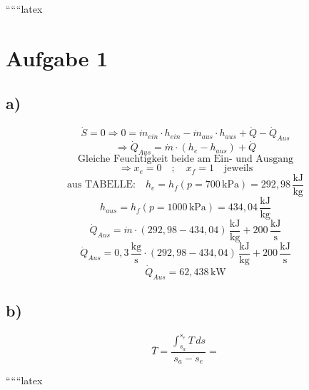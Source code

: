 
``````latex


\section*{Aufgabe 1}

\subsection*{a)}
\[
\dot{S} = 0 \Rightarrow 0 = \dot{m}_{ein} \cdot h_{ein} - \dot{m}_{aus} \cdot h_{aus} + \dot{Q} - \dot{Q}_{Aus}
\]
\[
\Rightarrow \dot{Q}_{Aus} = \dot{m} \cdot (h_e - h_{aus}) + \dot{Q}
\]
\[
\text{Gleiche Feuchtigkeit beide am Ein- und Ausgang}
\]
\[
\Rightarrow x_e = 0 \quad ; \quad x_f = 1 \quad \text{jeweils}
\]
\[
\text{aus TABELLE:} \quad h_e = h_f (p = 700 \, \text{kPa}) = 292,98 \, \frac{\text{kJ}}{\text{kg}}
\]
\[
h_{aus} = h_f (p = 1000 \, \text{kPa}) = 434,04 \, \frac{\text{kJ}}{\text{kg}}
\]
\[
\dot{Q}_{Aus} = \dot{m} \cdot \left(292,98 - 434,04\right) \, \frac{\text{kJ}}{\text{kg}} + 200 \, \frac{\text{kJ}}{\text{s}}
\]
\[
\dot{Q}_{Aus} = 0,3 \, \frac{\text{kg}}{\text{s}} \cdot \left(292,98 - 434,04\right) \, \frac{\text{kJ}}{\text{kg}} + 200 \, \frac{\text{kJ}}{\text{s}}
\]
\[
\dot{Q}_{Aus} = 62,438 \, \text{kW}
\]

\subsection*{b)}
\[
\bar{T} = \frac{\int_{s_a}^{s_e} T \, ds}{s_a - s_e} = 
\]

``````latex


